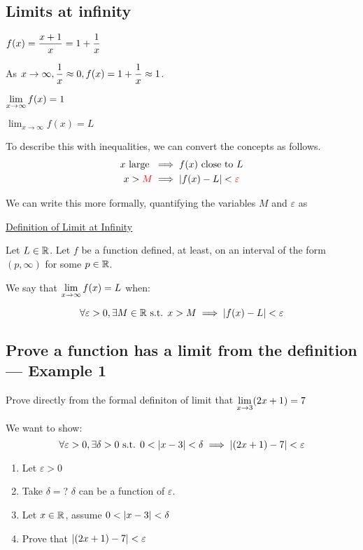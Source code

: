 \subsection{Limits at infinity}

\(\displaystyle f(x) = \frac{x + 1}{x} = 1 + \frac{1}{x}\)

As \(\displaystyle x \to \infty, \frac{1}{x} \approx 0, f(x) = 1 + \frac{1}{x} \approx 1\).

\(\displaystyle \lim_{x \to \infty} f(x) = 1\)


\(\lim_{x \to \infty} f(x) = L\)

To describe this with inequalities, we can convert the concepts as follows.
\begin{align*}
x \text{ large } &\implies f(x) \text{ close to } L \\
x > {\color{red}M} &\implies \left|f(x) - L\right| < {\color{red}\varepsilon}
\end{align*}

We can write this more formally, quantifying the variables \(M\) and \(\varepsilon\) as

\begin{mdframed}
  \underline{Definition of Limit at Infinity}

  Let \(L \in \mathbb{R}\). Let \(f\) be a function defined, at least, on an interval of the form \((p, \infty)\) for some \(p \in \mathbb{R}\).

  We say that \(\displaystyle \lim_{x \to \infty} f(x) = L\) when:

  \[\forall \varepsilon > 0, \exists M \in \mathbb{R} \text{ s.t. } x > M \implies \left|f(x) - L\right| < \varepsilon\]
\end{mdframed}

\subsection{Prove a function has a limit from the definition --- Example 1}

Prove directly from the formal definiton of limit that \(\displaystyle \lim_{x \to 3} (2x + 1) = 7\)

We want to show:
\[\forall \varepsilon > 0, \exists \delta > 0 \text{ s.t. } 0 < \left|x - 3\right| < \delta \implies \left|\left(2x + 1\right) - 7\right| < \varepsilon\]

\begin{enumerate}
  \item Let \(\varepsilon > 0\)
  \item Take \(\delta = \)? \(\delta\) can be a function of \(\varepsilon\).
  \item Let \(x \in \mathbb{R}\), assume \(0 < \left|x - 3\right| < \delta\)
  \item Prove that \(\left|\left(2x + 1\right) - 7\right| < \varepsilon\)
\end{enumerate}


